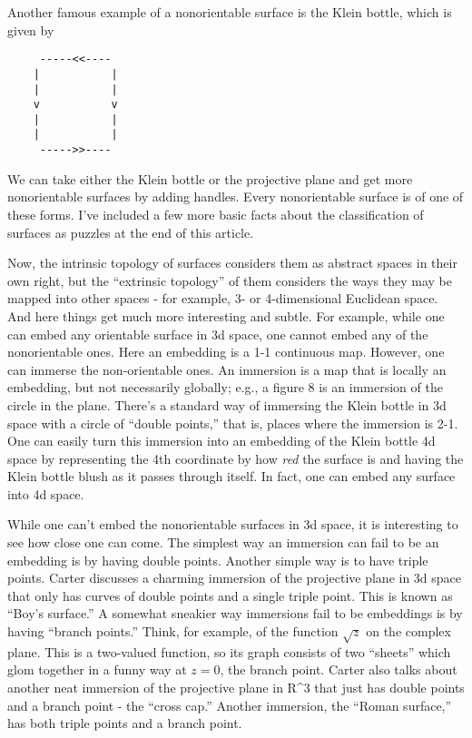 \documentclass{article}
\begin{document}
Another famous example of a nonorientable surface is the Klein bottle,
which is given by

\begin{verbatim}
     -----<<----
    |           |
    |           |
    v           v
    |           |
    |           |
     ----->>----
\end{verbatim}

We can take either the Klein bottle or the projective plane and get more
nonorientable surfaces by adding handles. Every nonorientable surface is
of one of these forms. I've included a few more basic facts about the
classification of surfaces as puzzles at the end of this article.

Now, the intrinsic topology of surfaces considers them as abstract
spaces in their own right, but the ``extrinsic topology'' of them
considers the ways they may be mapped into other spaces - for example,
3- or 4-dimensional Euclidean space. And here things get much more
interesting and subtle. For example, while one can embed any orientable
surface in 3d space, one cannot embed any of the nonorientable ones.
Here an embedding is a 1-1 continuous map. However, one can immerse the
non-orientable ones. An immersion is a map that is locally an embedding,
but not necessarily globally; e.g., a figure 8 is an immersion of the
circle in the plane. There's a standard way of immersing the Klein
bottle in 3d space with a circle of ``double points,'' that is, places
where the immersion is 2-1. One can easily turn this immersion into an
embedding of the Klein bottle 4d space by representing the 4th
coordinate by how \emph{red} the surface is and having the Klein bottle
blush as it passes through itself. In fact, one can embed any surface
into 4d space.

While one can't embed the nonorientable surfaces in 3d space, it is
interesting to see how close one can come. The simplest way an immersion
can fail to be an embedding is by having double points. Another simple
way is to have triple points. Carter discusses a charming immersion of
the projective plane in 3d space that only has curves of double points
and a single triple point. This is known as ``Boy's surface.'' A
somewhat sneakier way immersions fail to be embeddings is by having
``branch points.'' Think, for example, of the function \(\sqrt{z}\) on
the complex plane. This is a two-valued function, so its graph consists
of two ``sheets'' which glom together in a funny way at \(z = 0\), the
branch point. Carter also talks about another neat immersion of the
projective plane in R\^{}3 that just has double points and a branch
point - the ``cross cap.'' Another immersion, the ``Roman surface,'' has
both triple points and a branch point.
\end{document}
